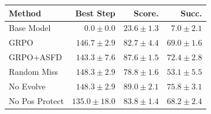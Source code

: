 \begin{tabular}{lrrr}
\toprule
Method & Best Step & Score. & Succ. \\
\midrule
Base Model & $0.0 \pm 0.0$ & $23.6 \pm 1.3$ & $7.0 \pm 2.1$ \\
GRPO & $146.7 \pm 2.9$ & $82.7 \pm 4.4$ & $69.0 \pm 1.6$ \\
GRPO+ASFD & $143.3 \pm 7.6$ & $87.6 \pm 1.5$ & $72.4 \pm 2.8$ \\
Random Miss & $148.3 \pm 2.9$ & $78.8 \pm 1.6$ & $53.1 \pm 5.5$ \\
No Evolve & $148.3 \pm 2.9$ & $89.0 \pm 2.1$ & $75.8 \pm 3.1$ \\
No Pos Protect & $135.0 \pm 18.0$ & $83.8 \pm 1.4$ & $68.2 \pm 2.4$ \\
\bottomrule
\end{tabular}
